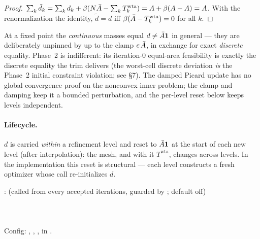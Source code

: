 \documentclass[11pt,a4paper]{article}
\begin{document}
\begin{proof}
$\sum_k\tilde d_k = \sum_k d_k + \beta(N\bar{A} - \sum_k T^{\mathrm{wta}}_k)
 = A + \beta(A - A) = A$. With the renormalization the identity,
$\tilde d = d$ iff $\beta(\bar{A} - T^{\mathrm{wta}}_k)=0$ for all $k$.
\end{proof}

\begin{remark}
At a fixed point the \emph{continuous} masses equal
$d \neq \bar{A}\mathbf 1$ in general — they are deliberately unpinned by up to
the clamp $c\,\bar{A}$, in exchange for exact \emph{discrete} equality. Phase~2
is indifferent: its iteration-0 equal-area feasibility is exactly the
discrete equality the trim delivers (the worst-cell discrete deviation
\emph{is} the Phase~2 initial constraint violation; see
 \S7). The
damped Picard update has no global convergence proof on the nonconvex inner
problem; the clamp and damping keep it a bounded perturbation, and the
per-level reset below keeps levels independent.
\end{remark}

\paragraph{Lifecycle.}
$d$ is carried \emph{within} a refinement level and reset to $\bar{A}\mathbf 1$
at the start of each new level (after interpolation): the mesh, and with it
$T^{\mathrm{wta}}$, changes across levels. In the implementation this reset
is structural — each level constructs a fresh optimizer whose 
call re-initializes $d$.

\begin{tcolorbox}[colback=blue!4!white, colframe=blue!40!black,
                  title={Code: discrete-area trim}, fontupper=\small]
: 
(called from  every  accepted
iterations, guarded by ; default off)\\[2pt]
\\
\\
\\[2pt]
Config: , ,
,  in .
\end{tcolorbox}
\end{document}
